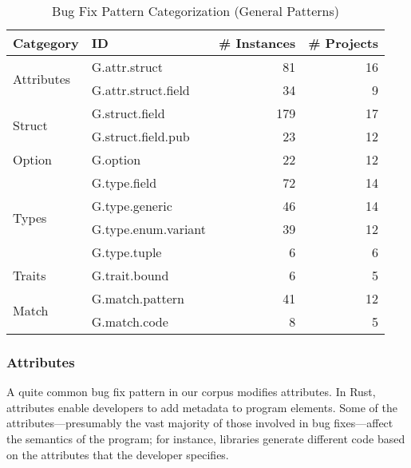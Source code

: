 \begin{table}[]

\begin{tabular}{l|l|r|r}
\textbf{Catgegory} & \textbf{ID} & \textbf{\# Instances} & \textbf{\# Projects} \\
\hline
\multirow{2}{*}{Attributes} & G.attr.struct & 81 & 16                                  \\
& G.attr.struct.field & 34 & 9                     \\\cline{1-4}
\multirow{2}{*}{Struct} & G.struct.field  & 179 & 17\\
& G.struct.field.pub & 23 & 12   
\\\cline{1-4}
Option & G.option & 22 & 12                    \\\cline{1-4}
\multirow{4}{*}{Types} & G.type.field  & 72 & 14 \\
& G.type.generic & 46 & 14\\ & G.type.enum.variant  & 39 & 12 \\
& G.type.tuple & 6 & 6                                         \\\cline{1-4}
\multirow{1}{*}{Traits} & G.trait.bound & 6 & 5 \\\cline{1-4}
\multirow{2}{*}{Match} & G.match.pattern & 41 & 12 \\
& G.match.code & 8 & 5 \\
\end{tabular}
\caption{\label{table:general}Bug Fix Pattern Categorization (General Patterns)}
\end{table}
    

\subsubsection{Attributes}
A quite common bug fix pattern in our corpus modifies attributes. In Rust, attributes enable developers to add metadata to program elements. Some of the attributes---presumably the vast majority of those involved in bug fixes---affect the semantics of the program; for instance, libraries generate different code based on the attributes that the developer specifies.

